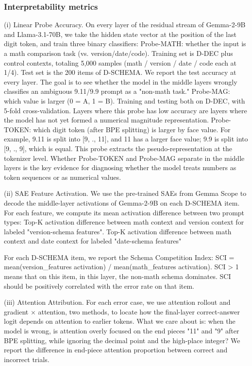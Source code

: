 \subsubsection{Interpretability metrics}

(i) Linear Probe Accuracy. On every layer of the residual stream of Gemma-2-9B and Llama-3.1-70B, we take the hidden state vector at the position of the last digit token, and train three binary classifiers: Probe-MATH: whether the input is a math comparison task (vs. version/date/code). Training set is D-DEC plus control contexts, totaling 5,000 samples (math / version / date / code each at 1/4). Test set is the 200 items of D-SCHEMA. We report the test accuracy at every layer. The goal is to see whether the model in the middle layers wrongly classifies an ambiguous 9.11/9.9 prompt as a "non-math task." Probe-MAG: which value is larger (0 = A, 1 = B). Training and testing both on D-DEC, with 5-fold cross-validation. Layers where this probe has low accuracy are layers where the model has not yet formed a numerical magnitude representation. Probe-TOKEN: which digit token (after BPE splitting) is larger by face value. For example, 9.11 is split into [9, ., 11], and 11 has a larger face value; 9.9 is split into [9, ., 9], which is equal. This probe extracts the pseudo-representation at the tokenizer level. Whether Probe-TOKEN and Probe-MAG separate in the middle layers is the key evidence for diagnosing whether the model treats numbers as token sequences or as numerical values.

(ii) SAE Feature Activation. We use the pre-trained SAEs from Gemma Scope to decode the middle-layer activations of Gemma-2-9B on each D-SCHEMA item. For each feature, we compute its mean activation difference between two prompt types: Top-K activation difference between math context and version context for labeled "version-schema features". Top-K activation difference between math context and date context for labeled "date-schema features"

For each D-SCHEMA item, we report the Schema Competition Index: SCI = mean(version\_features activation) / mean(math\_features activation). SCI > 1 means that on this item, in this layer, the non-math schema dominates. SCI should be positively correlated with the error rate on that item.

(iii) Attention Attribution. For each error case, we use attention rollout\cite{abnar2020} and gradient × attention, two methods, to locate how the final-layer correct-answer logit depends on attention to earlier tokens. What we care about is: when the model is wrong, is attention overly focused on the end pieces "11" and "9" after BPE splitting, while ignoring the decimal point and the high-place integer? We report the difference in end-piece attention proportion between correct and incorrect trials.

